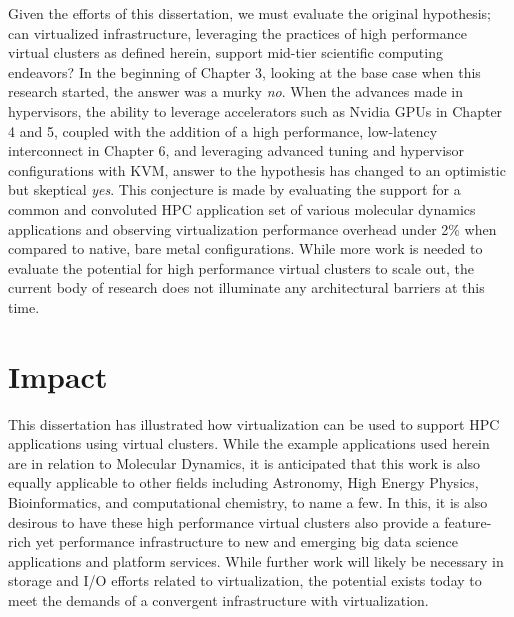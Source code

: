Given the efforts of this dissertation, we must evaluate the original hypothesis; can virtualized infrastructure, leveraging the practices of high performance virtual clusters as defined herein, support mid-tier scientific computing endeavors? In the beginning of Chapter 3, looking at the base case when this research started, the answer was a murky \emph{no}.  When the advances made in hypervisors, the ability to leverage accelerators such as Nvidia GPUs in Chapter 4 and 5, coupled with the addition of a high performance, low-latency interconnect in Chapter 6, and leveraging advanced tuning and hypervisor configurations with KVM, answer to the hypothesis has changed to an optimistic but skeptical \emph{yes}.  This conjecture is made by evaluating the support for a common and convoluted HPC application set of various molecular dynamics applications and observing virtualization performance overhead under 2\% when compared to native, bare metal configurations.  While more work is needed to evaluate the potential for high performance virtual clusters to scale out, the current body of research does not illuminate any architectural barriers at this time.  





\section{Impact}
\label{sec:impact}

This dissertation has illustrated how virtualization can be used to support HPC applications using virtual clusters.  While the example applications used herein are in relation to Molecular Dynamics, it is anticipated that this work is also equally applicable to other fields including Astronomy, High Energy Physics, Bioinformatics, and computational chemistry, to name a few. In this, it is also desirous to have these high performance virtual clusters also provide a feature-rich yet performance infrastructure to new and emerging big data science applications and platform services.  While further work will likely be necessary in storage and I/O efforts related to virtualization, the potential exists today to meet the demands of a convergent infrastructure with virtualization.   

